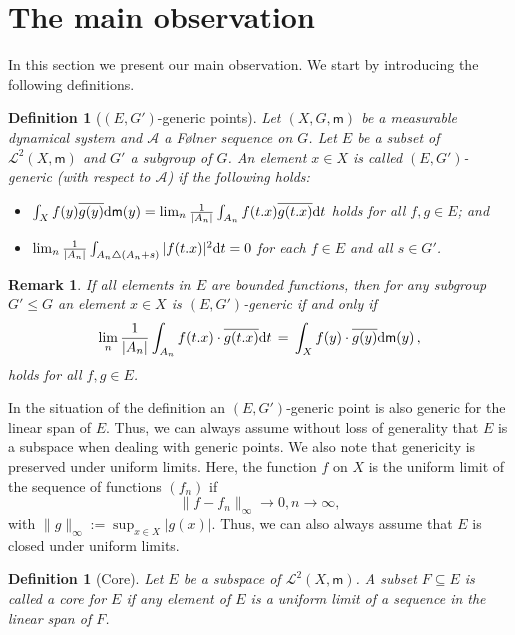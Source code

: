 \documentclass [14pt]{amsart}
\numberwithin{equation}{section}
\newcommand{\mm}{\mathsf{m}}
\newcommand{\dd}{\mbox{\rm d}}
\newtheorem{definition}[theorem]{Definition}
\newtheorem{remark}[theorem]{Remark}
\begin{document}
\section{The main observation}\label{sect:main}
In this section we present our main observation. We start by introducing the following definitions.

\bigskip

\begin{definition}[$(E,G')$-generic points] Let $(X,G, \mm)$ be a measurable dynamical system and $\mathcal{A}$ a F\o lner sequence on $G$.  Let $E$ be a subset of $\mathcal{L}^2 (X,\mm)$ and $G'$ a subgroup of $G$. An element $x\in X$ is called {\it $(E,G')$-generic (with respect to $\mathcal{A}$)} if the following holds:
\begin{itemize}
\item  $\int_X f(y) \overline{g(y)} \dd \mm(y) = \lim_n \frac{1}{|A_n|} \int_{A_n}  f(t.x) \overline{g(t.x)} \dd t$
holds for all $f,g\in E$; and
\item $\lim_n \frac{1}{|A_n|} \int_{A_n \triangle (A_n+s)} |f(t.x)|^2 \dd t = 0$ for each  $f\in E$ and all $s\in G'$.
\end{itemize}
\end{definition}


\begin{remark} If all elements in $E$ are bounded functions, then for any subgroup $G' \leq G$ an element $x \in X$ is $(E,G')$-generic if and only if
\[
\lim_n \frac{1}{|A_n|} \int_{A_n}  f(t.x)\cdot \overline{g(t.x)} \dd t \, = \, \int_X f(y)\cdot \overline{g(y)} \dd \mm(y) \,,
\]
holds for all $f,g \in E$.
\end{remark}

In  the situation of the definition an $(E,G')$-generic point is also generic for the linear span of $E$. Thus, we can always assume without loss of generality that $E$ is a subspace when dealing with generic points. We also note that genericity is preserved under uniform limits.  Here,  the function $f$ on $X$ is the uniform limit of the sequence of functions $(f_n)$ if
$$\|f - f_n\|_\infty\to 0,n \to \infty,$$
with $\|g\|_\infty :=\sup_{x\in X} |g(x)|$.
Thus, we can also always assume that $E$ is closed under uniform limits.


\begin{definition}[Core]
Let $E$ be a subspace of $\mathcal{L}^2 (X, \mm)$. A subset $F \subseteq E$  is called a {\rm core for $E$} if any element of $E$ is a uniform limit of a sequence in the linear span of $F$.
\end{definition}
\end{document}
